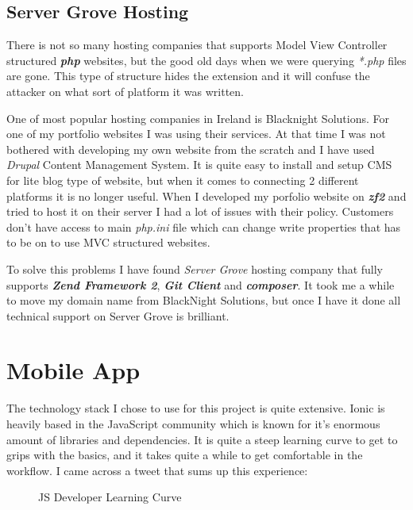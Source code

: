 	
    \subsection{Server Grove Hosting}
There is not so many hosting companies that supports Model View Controller structured \textbf{\textit{php}} websites, but the good old days when we were querying \textit{*.php} files are gone. This type of structure hides the extension and it will confuse the attacker on what sort of platform it was written.

One of most popular hosting companies in Ireland is Blacknight Solutions. For one of my portfolio websites I was using their services. At that time I was not bothered with developing my own website from the scratch and I have used \textit{Drupal} Content Management System. It is quite easy to install and setup CMS for lite blog type of website, but when it comes to connecting 2 different platforms it is no longer useful. When I developed my porfolio website on \textbf{\textit{zf2}} and tried to host it on their server I had a lot of issues with their policy. Customers don't have access to main \textit{php.ini} file which can change write properties that has to be on to use MVC structured websites. 

To solve this problems I have found \textit{Server Grove} hosting company that fully supports \textbf{\textit{Zend Framework 2}}, \textbf{\textit{Git Client}} and  \textbf{\textit{composer}}. It took me a while to move my domain name from BlackNight Solutions, but once I have it done all technical support on Server Grove is brilliant.


  \section{Mobile App} %
The technology stack I chose to use for this project is quite extensive.  
Ionic is heavily based in the JavaScript community which is known for it's enormous amount of libraries and dependencies.
It is quite a steep learning curve to get to grips with the basics, and it takes quite a while to get comfortable in the workflow.
I came across a tweet that sums up this experience:
\begin{figure}[H] 
	\caption{JS Developer Learning Curve}
	\label{fig:speciation}
\end{figure}


